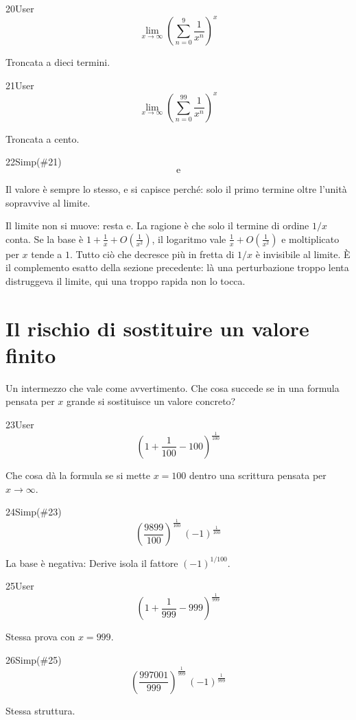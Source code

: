 \begin{espr}{20}{User}{}
\[
\lim_{x \to \infty} \left(\sum_{n=0}^{9} \frac{1}{x^{n}}\right)^{x}
\]
\end{espr}
Troncata a dieci termini.

\begin{espr}{21}{User}{}
\[
\lim_{x \to \infty} \left(\sum_{n=0}^{99} \frac{1}{x^{n}}\right)^{x}
\]
\end{espr}
Troncata a cento.

\begin{espr}{22}{Simp(\#21)}{}
\[
\mathrm{e}
\]
\end{espr}
Il valore è sempre lo stesso, e si capisce perché: solo il primo termine oltre l'unità sopravvive al limite.


Il limite non si muove: resta $\mathrm{e}$. La ragione è che solo il termine di ordine $1/x$ conta. Se la base è $1+\tfrac1x+O\!\left(\tfrac{1}{x^2}\right)$, il logaritmo vale $\tfrac1x+O\!\left(\tfrac{1}{x^2}\right)$ e moltiplicato per $x$ tende a $1$. Tutto ciò che decresce più in fretta di $1/x$ è invisibile al limite. È il complemento esatto della sezione precedente: là una perturbazione troppo lenta distruggeva il limite, qui una troppo rapida non lo tocca.

\section{Il rischio di sostituire un valore finito}

Un intermezzo che vale come avvertimento. Che cosa succede se in una formula pensata per $x$ grande si sostituisce un valore concreto?

\begin{espr}{23}{User}{}
\[
\left(1 + \frac{1}{100} - 100\right)^{\frac{1}{100}}
\]
\end{espr}
Che cosa dà la formula se si mette $x=100$ dentro una scrittura pensata per $x\to\infty$.

\begin{espr}{24}{Simp(\#23)}{}
\[
\left(\frac{9899}{100}\right)^{\frac{1}{100}}\, \left(-1\right)^{\frac{1}{100}}
\]
\end{espr}
La base è negativa: Derive isola il fattore $(-1)^{1/100}$.

\begin{espr}{25}{User}{}
\[
\left(1 + \frac{1}{999} - 999\right)^{\frac{1}{999}}
\]
\end{espr}
Stessa prova con $x=999$.

\begin{espr}{26}{Simp(\#25)}{}
\[
\left(\frac{997001}{999}\right)^{\frac{1}{999}}\, \left(-1\right)^{\frac{1}{999}}
\]
\end{espr}
Stessa struttura.

